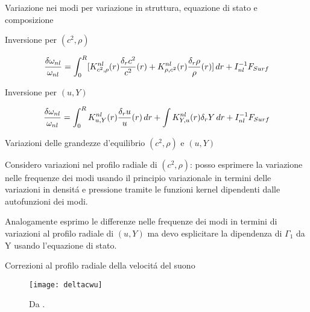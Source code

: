 \documentclass[10pt,xcolor={usenames},fleqn,mathserif,serif]{beamer}
\begin{document}
\begin{frame}{Variazione nei modi per variazione in struttura, equazione di stato e composizione}

\begin{block}{Inversione per $(c^2,\rho)$}

\begin{equation*}
\frac{\delta\omega_{nl}}{\omega_{nl}}=\int_0^R[K^{nl}_{c^2,\rho}(r)\frac{\delta_rc^2}{c^2}(r)+K^{nl}_{\rho,c^2}(r)\frac{\delta_r\rho}{\rho}(r)]\,dr+I_{nl}^{-1}F_{Surf}
\end{equation*}

\end{block}

\begin{block}{Inversione per $(u,Y)$}

\begin{equation*}
\frac{\delta\omega_{nl}}{\omega_{nl}}=\int_0^RK^{nl}_{u,Y}(r)\frac{\delta_ru}{u}(r)\,dr+\int K^{nl}_{Y,u}(r)\delta_rY\,dr+I_{nl}^{-1}F_{Surf}
\end{equation*}

\end{block}

\end{frame}

\begin{wordonframe}{Variazioni delle grandezze d'equilibrio $(c^2,\rho)$ e $(u,Y)$}

Considero variazioni nel profilo radiale di $(c^2,\rho)$: posso esprimere la variazione nelle frequenze dei modi usando il principio variazionale in termini delle variazioni in densit\'a e pressione tramite le funzioni kernel dipendenti dalle autofunzioni dei modi.

Analogamente  esprimo le differenze nelle frequenze dei modi in termini di variazioni al profilo radiale di $(u,Y)$ ma devo esplicitare la dipendenza di $\Gamma_1$ da Y usando l'equazione di stato.

\end{wordonframe}



\begin{frame}{Correzioni al profilo radiale della velocit\'a del suono}

\begin{figure}[!ht]%
        \texttt{[image: deltacwu]}
        \caption{Da \cite{villante2014chemical}.}\label{fig:deltacwu}
\end{figure}

\end{frame}
\end{document}
